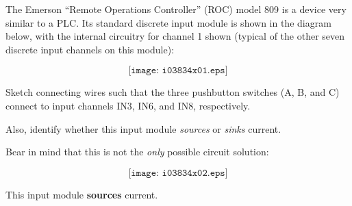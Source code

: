 

The Emerson ``Remote Operations Controller'' (ROC) model 809 is a device very similar to a PLC.  Its standard discrete input module is shown in the diagram below, with the internal circuitry for channel 1 shown (typical of the other seven discrete input channels on this module):

$$\texttt{[image: i03834x01.eps]}$$

Sketch connecting wires such that the three pushbutton switches (A, B, and C) connect to input channels IN3, IN6, and IN8, respectively.

\vskip 10pt

Also, identify whether this input module {\it sources} or {\it sinks} current.







Bear in mind that this is not the {\it only} possible circuit solution:

$$\texttt{[image: i03834x02.eps]}$$

This input module {\bf sources} current.











